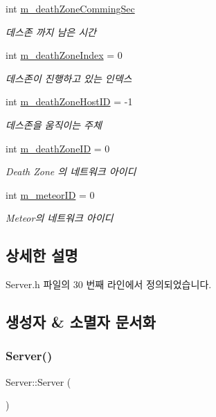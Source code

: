 \begin{DoxyCompactItemize}
int \hyperlink{class_server_ac613fa786c19b3604dac2fd1619293c3}{m\+\_\+death\+Zone\+Comming\+Sec}
\begin{DoxyCompactList}\small\item\em 데스존 까지 남은 시간 \end{DoxyCompactList}\item 
int \hyperlink{class_server_a279c9f26f808acc351f9167ece2d39fb}{m\+\_\+death\+Zone\+Index} = 0
\begin{DoxyCompactList}\small\item\em 데스존이 진행하고 있는 인덱스 \end{DoxyCompactList}\item 
int \hyperlink{class_server_af34b71075ab32b4b7a4da757c87ded13}{m\+\_\+death\+Zone\+Host\+ID} = -\/1
\begin{DoxyCompactList}\small\item\em 데스존을 움직이는 주체 \end{DoxyCompactList}\item 
int \hyperlink{class_server_a65e72b65d1be2dc79fddb0433402cd81}{m\+\_\+death\+Zone\+ID} = 0
\begin{DoxyCompactList}\small\item\em Death Zone 의 네트워크 아이디 \end{DoxyCompactList}\item 
int \hyperlink{class_server_ab4f0de3a4d653f8b8631caf922643414}{m\+\_\+meteor\+ID} = 0
\begin{DoxyCompactList}\small\item\em Meteor의 네트워크 아이디 \end{DoxyCompactList}\end{DoxyCompactItemize}


\subsection{상세한 설명}


Server.\+h 파일의 30 번째 라인에서 정의되었습니다.



\subsection{생성자 \& 소멸자 문서화}
\mbox{\label{class_server_ad5ec9462b520e59f7ea831e157ee5e59}} 
\subsubsection{\texorpdfstring{Server()}{Server()}}
{\footnotesize\ttfamily Server\+::\+Server (\begin{DoxyParamCaption}{ }\end{DoxyParamCaption})}



